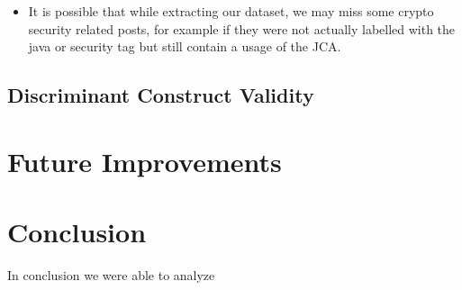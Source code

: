 \documentclass[10pt, conference]{IEEEtran}
\begin{document}
\begin{itemize}
\item
It is possible that while extracting our dataset, we may miss some crypto security related posts, for example if they were not actually labelled with the java or security tag but still contain a usage of the JCA. 


\end{itemize}

\subsection{Discriminant Construct Validity}



\section{Future Improvements}
 

\section{Conclusion}

In conclusion we were able to analyze 

\printbibliography
\end{document}

